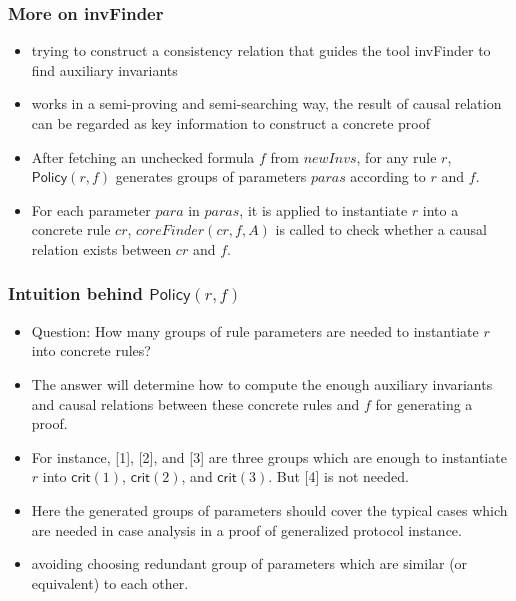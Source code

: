 \documentclass{beamer}
\newcommand{\forget}[1]{}
\begin{document}
\begin{frame}\frametitle{More on {\sf invFinder}}


\begin{itemize}
\item trying to construct a consistency relation that
guides the tool {\sf invFinder} to find auxiliary invariants

\forget{\item using an oracles that checks whether a ground
formula is an invariant in the small reference model


\item Searching not only auxiliary invariants but also causal relations

\item   protocol.tbl:  storing the searching result}

\item works in a semi-proving and semi-searching way, the result of causal relation can be regarded as key information to construct a concrete proof

\item After fetching an unchecked formula $f$ from $newInvs$, for any rule $r$, $\mathsf{Policy}(r,f)$  generates groups of parameters $paras$  according to $r$ and $f$.

\item     For each parameter $para$ in $paras$,   it is applied to instantiate $r$ into a concrete rule $cr$,  $coreFinder(cr,  f, A)$ is called to check
 whether  a causal relation exists between $cr$ and $f$.
\end{itemize}
 \end{frame}


\begin{frame}\frametitle{Intuition behind $\mathsf{Policy}(r,f)$}


\begin{itemize}
\item Question: How many groups of rule parameters  are needed to instantiate $r$ into concrete rules?

\item The answer will determine how to compute the enough auxiliary invariants and causal relations between these concrete rules and $f$ for generating a proof.

\item For instance, [1], [2], and [3] are three groups which are enough to instantiate $r$ into $\mathsf{crit}(1)$, $\mathsf{crit}(2)$, and $\mathsf{crit}(3)$. But [4] is not needed.

\item Here the generated groups of parameters should cover the typical cases  which are needed in case analysis in a proof of generalized protocol instance.

\item avoiding choosing redundant group of parameters   which are similar  (or equivalent) to each other.
\end{itemize}
 \end{frame}
\end{document}
